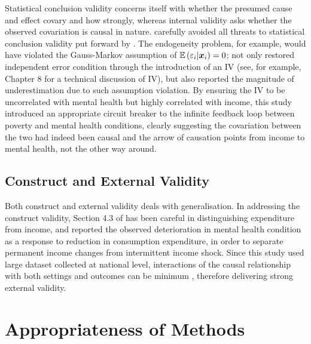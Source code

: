 Statistical conclusion validity concerns itself with whether the presumed cause and effect covary and how strongly, whereas internal validity asks whether the observed covariation is causal in nature. \textcite{hanandita:2014} carefully avoided all threats to statistical conclusion validity put forward by \textcite[][Table 2.2, p. 45]{shadish:2002}. The endogeneity problem, for example, would have violated the Gauss-Markov assumption of $\mathbb{E}\left(\varepsilon_i | \boldsymbol{x}_i\right)=0$; \textcite{hanandita:2014} not only restored independent error condition through the introduction of an IV (see, for example, \textcite{greene:2018} Chapter 8 for a technical discussion of IV), but also reported the magnitude of underestimation due to such assumption violation. By ensuring the IV to be uncorrelated with mental health but highly correlated with income, this study introduced an appropriate circuit breaker to the infinite feedback loop between poverty and mental health conditions, clearly suggesting the covariation between the two had indeed been causal and the arrow of causation points from income to mental health, not the other way around.

\subsection{Construct and External Validity}

Both construct and external validity deals with generalisation. In addressing the construct validity, Section 4.3 of \textcite{hanandita:2014} has been careful in distinguishing expenditure from income, and reported the observed deterioration in mental health condition as a response to reduction in consumption expenditure, in order to separate permanent income changes from intermittent income shock. Since this study used large dataset collected at national level, interactions of the causal relationship with both settings and outcomes can be minimum \parencite[see Table 3.2,][p. 87]{shadish:2002}, therefore delivering strong external validity.

\section{Appropriateness of Methods}

